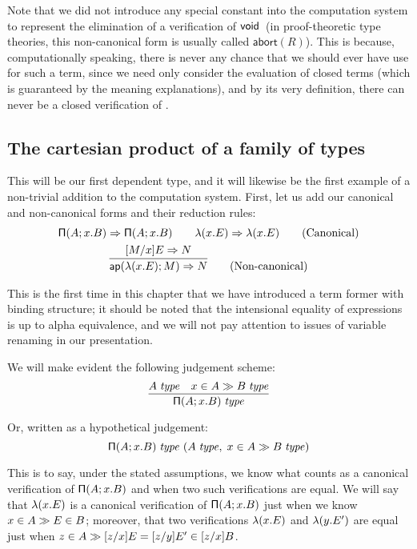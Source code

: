 \documentclass[main.tex]{subfiles}
\begin{document}
Note that we did not introduce any special constant into the
computation system to represent the elimination of a verification of
$\mathsf{void}$\ (in proof-theoretic type theories, this non-canonical form
is usually called $\mathsf{abort}(R)$).  This is because,
computationally speaking, there is never any chance that we should
ever have use for such a term, since we need only consider the
evaluation of closed terms (which is guaranteed by the meaning
explanations), and by its very definition, there can never be a closed
verification of \tyvoid.

\subsection{The cartesian product of a family of types}

This will be our first dependent type, and it will likewise be the first
example of a non-trivial addition to the computation system. First, let us add
our canonical and non-canonical forms and their reduction rules:
\begin{gather*}
  \reduce{\typrod{A}{x}{B}}{\typrod{A}{x}{B}}
  \qquad
  \reduce{\lam{x}{E}}{\lam{x}{E}}
  \tag{Canonical}\\
  \infer{
    \reduce{\ap{\lam{x}{E}}{M}}{N}
  }{
    \reduce{[M/x]E}{N}
  }\tag{Non-canonical}
\end{gather*}

This is the first time in this chapter that we have introduced a term former
with binding structure; it should be noted that the intensional equality of
expressions is up to alpha equivalence, and we will not pay attention to issues
of variable renaming in our presentation.

We will make evident the following judgement scheme:
\[
  \infer{
    \isset{\typrod{A}{x}{B}}
  }{
    \isset{A} &
    \sequent{\ver{x}{A}}{\isset{B}}
  }
\]

Or, written as a hypothetical judgement:
\[
  \mathsf{\Pi}(A;x.B)\;\mathit{type}\ (A\;\mathit{type},\;x\in A\gg B\;\mathit{type})
\]

This is to say, under the stated assumptions, we know what counts as a
canonical verification of $\mathsf{\Pi}(A;x.B)$ and when two such
verifications are equal. We will say that $\mathsf{\lambda}(x.E)$ is a canonical
verification of $\mathsf{\Pi}(A;x.B)$ just when we know
$x\in A\gg E\in B$; moreover, that two verifications
$\mathsf{\lambda}(x.E)$ and $\mathsf{\lambda}(y.E')$ are equal just when
$z\in A\gg[z/x]E=[z/y]E'\in[z/x]B$.
\end{document}
